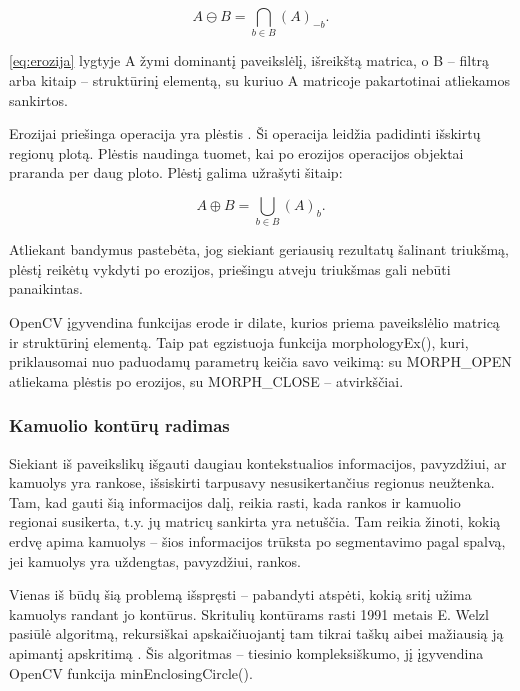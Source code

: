 \documentclass{VUMIFPSbakalaurinis}
\begin{document}
\begin{equation}\label{eq:erozija}
	A \ominus B = \bigcap_ {b \in B } (A)_{-b} .
\end{equation}

\ref{eq:erozija} lygtyje A žymi dominantį paveikslėlį, išreikštą matrica, o B – filtrą arba kitaip – struktūrinį elementą, su kuriuo A matricoje pakartotinai atliekamos sankirtos.  

Erozijai priešinga operacija yra plėstis \cite{4767941}. Ši operacija leidžia padidinti išskirtų regionų plotą. Plėstis naudinga tuomet, kai po erozijos operacijos objektai praranda per daug ploto. Plėstį galima užrašyti šitaip:

\begin{equation}\label{eq:plestis}
	A \oplus B = \bigcup_ {b \in B } (A)_{b} .
\end{equation}

Atliekant bandymus pastebėta, jog siekiant geriausių rezultatų šalinant triukšmą, plėstį reikėtų vykdyti po erozijos, priešingu atveju triukšmas gali nebūti panaikintas. 

OpenCV įgyvendina funkcijas erode ir dilate, kurios priema paveikslėlio matricą ir struktūrinį elementą. Taip pat egzistuoja funkcija morphologyEx(), kuri, priklausomai nuo paduodamų parametrų keičia savo veikimą: su MORPH\_OPEN atliekama plėstis po erozijos, su MORPH\_CLOSE – atvirkščiai. 

\subsubsection{Kamuolio kontūrų radimas}

Siekiant iš paveikslikų išgauti daugiau kontekstualios informacijos, pavyzdžiui, ar kamuolys yra rankose, išsiskirti tarpusavy nesusikertančius regionus neužtenka. Tam, kad gauti šią informacijos dalį, reikia rasti, kada rankos ir kamuolio regionai susikerta, t.y. jų matricų sankirta yra netuščia. Tam reikia žinoti, kokią erdvę apima kamuolys – šios informacijos trūksta po segmentavimo pagal spalvą, jei kamuolys yra uždengtas, pavyzdžiui, rankos. 

Vienas iš būdų šią problemą išspręsti – pabandyti atspėti, kokią sritį užima kamuolys randant jo kontūrus. Skritulių kontūrams rasti 1991 metais E. Welzl pasiūlė algoritmą, rekursiškai apskaičiuojantį tam tikrai taškų aibei mažiausią ją apimantį apskritimą \cite{Welzl91smallestenclosing}. Šis algoritmas – tiesinio kompleksiškumo, jį įgyvendina OpenCV funkcija minEnclosingCircle().       
\end{document}
